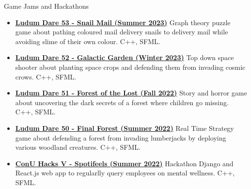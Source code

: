 \documentclass[]{mcdowellcv}
\begin{document}
	\begin{cvsection}{Game Jams and Hackathons}
		\begin{cvsubsection}{}{}{}	
			\begin{itemize}
                \item \textbf{\href{https://ldjam.com/events/ludum-dare/53/snail-mail-2}{Ludum Dare 53 - Snail Mail (Summer 2023)}} Graph theory puzzle game about pathing coloured mail delivery snails to delivery mail while avoiding slime of their own colour. C++, SFML.
				\item \textbf{\href{https://ldjam.com/events/ludum-dare/52/galactic-garden}{Ludum Dare 52 - Galactic Garden (Winter 2023)}} Top down space shooter about planting space crops and defending them from invading cosmic crows. C++, SFML.
				\item \textbf{\href{https://ldjam.com/events/ludum-dare/51/forest-of-the-lost}{Ludum Dare 51 - Forest of the Lost (Fall 2022)}} Story and horror game about uncovering the dark secrets of a forest where children go missing. C++, SFML.
				\item \textbf{\href{https://ldjam.com/events/ludum-dare/50/final-forest}{Ludum Dare 50 - Final Forest (Summer 2022)}} Real Time Strategy game about defending a forest from invading lumberjacks by deploying various woodland creatures. C++, SFML.
				\item \textbf{\href{https://github.com/Team-Blockchain-Ai-Machine-Learning/Spotifeels}{ConU Hacks V - Spotifeels (Summer 2022)}} Hackathon Django and React.js web app to regularlly query employees on mental wellness. C++, SFML.
			\end{itemize}
		\end{cvsubsection}
	\end{cvsection}
	
\end{document}
